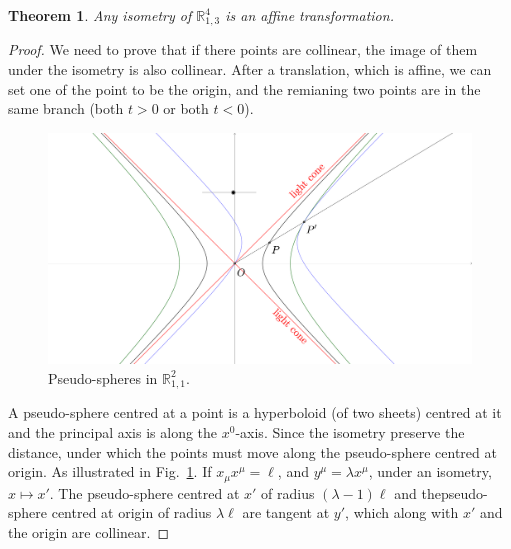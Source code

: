 \documentclass[openany]{book}
\theoremstyle{plain}
\newtheorem{theorem}{Theorem}[section] %
\theoremstyle{definition}
\begin{document}
\begin{theorem}
	Any isometry of $\mathbb R^4_{1, 3}$ is an affine transformation.
\end{theorem}
\begin{proof}
	We need to prove that if there points are collinear, the image of them under the isometry is also collinear. 
	After a translation, which is affine, we can set one of the point to be the origin, and the remianing two points are in the same branch (both $t > 0$ or both $t < 0$). 

	\begin{figure}[h]
		\centering
		\includegraphics[width=12cm]{./img/special_reletivity.eps}
		\caption{Pseudo-spheres in $\mathbb R^2_{1,1}$.}
		\label{figure: special relativity}
	\end{figure}

	A pseudo-sphere centred at a point is a hyperboloid (of two sheets) centred at it and the principal axis is along the $x^0$-axis. 
	Since the isometry preserve the distance, under which the points must move along the pseudo-sphere centred at origin.
	As illustrated in Fig.~\ref{figure: special relativity}. 
	If $x_\mu x^\mu = \ell$, and $y^\mu = \lambda x^\mu$, under an isometry, $x \mapsto x'$. 
	The pseudo-sphere centred at $x'$ of radius $(\lambda - 1) \ell$ and thepseudo-sphere centred at origin of radius $\lambda \ell$ are tangent at $y'$, which along with $x'$ and the origin are collinear.	
\end{proof}


\backmatter{}
\nocite{*} %
\printbibliography[heading=bibliography, title={Bibliography}]
\printindex[symbol]

\printindex
\end{document}
